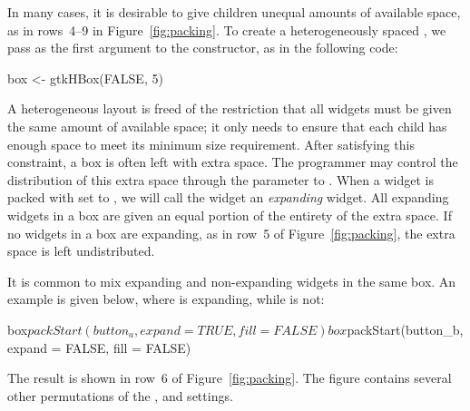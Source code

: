 In many cases, it is desirable to give children unequal amounts of
available space, as in rows~4--9 in Figure~\ref{fig:packing}. 
To create a heterogeneously spaced , we pass
 as the first argument to the constructor, as in the
following code:
\begin{Schunk}
\begin{Sinput}
 box <- gtkHBox(FALSE, 5)
\end{Sinput}
\end{Schunk}

A heterogeneous layout is freed of the restriction that all widgets
must be given the same amount of available space; it only needs to
ensure that each child has enough space to meet its minimum size
requirement. After satisfying this constraint, a box is often left
with extra space. The programmer may control the distribution of this
extra space through the  parameter
to .  When a widget is packed with
 set to , we will call
the widget an \emph{expanding} widget. All expanding widgets in a box
are given an equal portion of the entirety of the extra space. If no
widgets in a box are expanding, as in row~5 of
Figure~\ref{fig:packing}, the extra space is left undistributed. 

It is common to mix expanding and non-expanding widgets in the same
box.
An example is given below, where  is expanding,
while  is not:
%
\begin{Schunk}
\begin{Sinput}
 box$packStart(button_a, expand = TRUE, fill = FALSE)
 box$packStart(button_b, expand = FALSE, fill = FALSE)
\end{Sinput}
\end{Schunk}
%
The result is shown in row~6 of Figure~\ref{fig:packing}.  The figure
contains several other permutations of the
,
 and
 settings.

